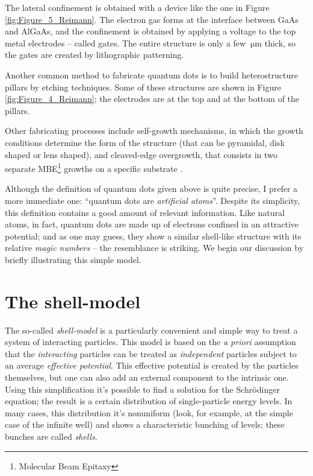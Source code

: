 The lateral confinement is obtained with a device like the one in Figure \ref{fig:Figure_5_Reimann}. The electron gas forms at the interface between GaAs and AlGaAs, and the confinement is obtained by applying a voltage to the top metal electrodes -- called gates. The entire structure is only a few $\SI{}{\micro\meter}$ thick, so the gates are created by lithographic patterning.

Another common method to fabricate quantum dots is to build heterostructure pillars by etching techniques. Some of these structures are shown in Figure \ref{fig:Figure_4_Reimann}; the electrodes are at the top and at the bottom of the pillars.

Other fabricating processes include self-growth mechanisms, in which the growth conditions determine the form of the structure (that can be pyramidal, disk shaped or lens shaped), and cleaved-edge overgrowth, that consists in two separate MBE\footnote{Molecular Beam Epitaxy} growths on a specific substrate \citep[see][]{Reimann2002}.

Although the definition of quantum dots given above is quite precise, I prefer a more immediate one: ``quantum dots are \emph{artificial atoms}''. Despite its simplicity, this definition contains a good amount of relevant information. Like natural atoms, in fact, quantum dots are made up of electrons confined in an attractive potential; and as one may guess, they show a similar shell-like structure with its relative \emph{magic numbers} -- the resemblance is striking. We begin our discussion by briefly illustrating this simple model.

\section{The shell-model}
\label{sec:shell_model}
The so-called \emph{shell-model} is a particularly convenient and simple way to treat a system of interacting particles. This model is based on the \emph{a priori} assumption that the \emph{interacting} particles can be treated as \emph{independent} particles subject to an average \emph{effective potential}. This effective potential is created by the particles themselves, but one can also add an external component to the intrinsic one. Using this simplification it's possible to find a solution for the Schr\"{o}dinger equation; the result is a certain distribution of single-particle energy levels. In many cases, this distribution it's nonuniform (look, for example, at the simple case of the infinite well) and shows a characteristic bunching of levels; these bunches are called \emph{shells}.

